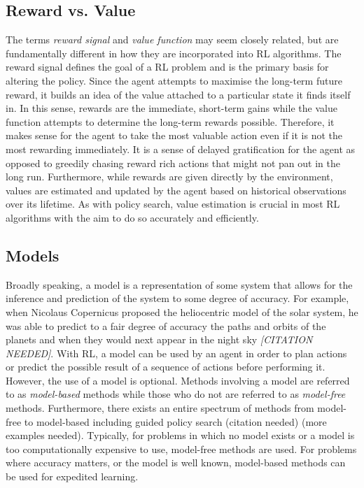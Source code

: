 \documentclass[12pt,notitlepage]{article}
\begin{document}
%    

\subsection{Reward vs. Value}

The terms \emph{reward signal} and \emph{value function} may seem closely
related, but are fundamentally different in how they are incorporated into RL
algorithms. The reward signal defines the goal of a RL problem and is the
primary basis for altering the policy. Since the agent attempts to maximise the
long-term future reward, it builds an idea of the value attached to a
particular state it finds itself in. In this sense, rewards are the immediate,
short-term gains while the value function attempts to determine the long-term
rewards possible. Therefore, it makes sense for the agent to take the most
valuable action even if it is not the most rewarding immediately. It is a sense
of delayed gratification for the agent as opposed to greedily chasing reward
rich actions that might not pan out in the long run. Furthermore, while rewards
are given directly by the environment, values are estimated and updated by the
agent based on historical observations over its lifetime. As with policy
search, value estimation is crucial in most RL algorithms with the aim to do so
accurately and efficiently.

\subsection{Models}

Broadly speaking, a model is a representation of some system that allows for
the inference and prediction of the system to some degree of accuracy. For
example, when Nicolaus Copernicus proposed the heliocentric model of the solar
system, he was able to predict to a fair degree of accuracy the paths and
orbits of the planets and when they would next appear in the night sky
\emph{[CITATION NEEDED]}. With RL, a model can be used by an agent in order to
plan actions or predict the possible result of a sequence of actions before
performing it. However, the use of a model is optional. Methods involving a
model are referred to as \emph{model-based} methods while those who do not are
referred to as \emph{model-free} methods. Furthermore, there exists an entire
spectrum of methods from model-free to model-based including guided policy
search (citation needed) (more examples needed). Typically, for problems in
which no model exists or a model is too computationally expensive to use,
model-free methods are used. For problems where accuracy matters, or the model
is well known, model-based methods can be used for expedited learning.



\end{document}
